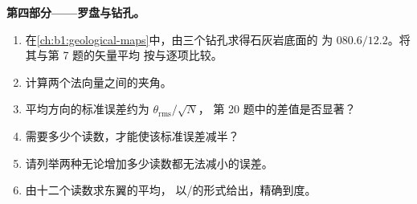 \begin{problem}
\medskip
\noindent\textbf{第四部分——罗盘与钻孔。}
\begin{enumerate}[resume]
  \item 在\cref{ch:b1:geological-maps}中，由三个钻孔求得石灰岩底面的
        为 $080.6/12.2$。将其与第 7 题的矢量平均
        按与逐项比较。
  \item 计算两个法向量之间的夹角。
  \item 平均方向的标准误差约为
        $\theta_{\text{rms}}/\sqrt N$，
        第 20 题中的差值是否显著？
  \item 需要多少个读数，才能使该标准误差减半？
  \item 请列举两种无论增加多少读数都无法减小的误差。
  \item 由十二个读数求东翼的平均，
        以/的形式给出，精确到度。
\end{enumerate}
\end{problem}
